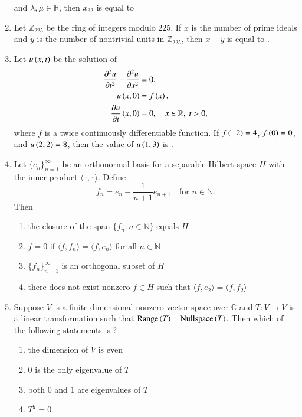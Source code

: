 \documentclass[journal,12pt,onecolumn]{IEEEtran}
\theoremstyle{remark}
\begin{document}
\begin{enumerate}[start=1, label=Q.\arabic*]
and $\lambda, \mu \in \mathbb{R}$, then $x_{32}$ is equal to \underline{\hspace{2cm}}

\hfill{}

\item Let $\mathbb{Z}_{225}$ be the ring of integers modulo $225$. If $x$ is the number of prime ideals and $y$ is the number of nontrivial units in $\mathbb{Z}_{225}$, then $x+y$ is equal to \underline{\hspace{2cm}}.

\hfill{}

\item Let $u\left(x,t\right)$ be the solution of
\begin{align*}
\frac{\partial^{2}u}{\partial t^{2}}-\frac{\partial^{2}u}{\partial x^{2}}&=0,\\
u\brak{x,0}&=f\brak{x},\\
\frac{\partial u}{\partial t}\brak{x,0}&=0,\quad x\in\mathbb{R},\ t>0,
\end{align*}
where $f$ is a twice continuously differentiable function. If $f\left(-2\right)=4$, $f\left(0\right)=0$, and $u\left(2,2\right)=8$, then the value of $u\left(1,3\right)$ is \underline{\hspace{2cm}}.

\hfill{}

\item Let $\{e_n\}_{n=1}^{\infty}$ be an orthonormal basis for a separable Hilbert space $H$ with the inner product $\langle\,\cdot,\cdot\,\rangle$. Define
\[
f_n=e_n-\frac{1}{n+1}e_{n+1}\quad \text{for } n\in\mathbb{N}.
\]
Then
\begin{enumerate}
\item the closure of the span $\{f_n: n\in\mathbb{N}\}$ equals $H$
\item $f=0$ if $\langle f,f_n\rangle=\langle f,e_n\rangle$ for all $n\in\mathbb{N}$
\item $\{f_n\}_{n=1}^{\infty}$ is an orthogonal subset of $H$
\item there does not exist nonzero $f\in H$ such that $\langle f,e_2\rangle=\langle f,f_2\rangle$
\end{enumerate}

\hfill{}

\item Suppose $V$ is a finite dimensional nonzero vector space over $\mathbb{C}$ and $T: V\to V$ is a linear transformation such that $\text{Range}\left(T\right)=\text{Nullspace}\left(T\right)$. Then which of the following statements is ?
\begin{enumerate}
\item the dimension of $V$ is even
\item $0$ is the only eigenvalue of $T$
\item both $0$ and $1$ are eigenvalues of $T$
\item $T^{2}=0$
\end{enumerate}


\end{enumerate}
\end{document}
